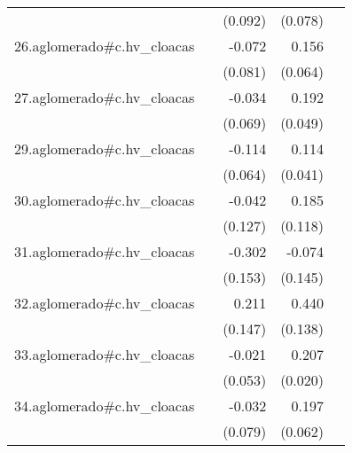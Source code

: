 {\begin{longtable}{l*{4}{D{.}{.}{-1}}}
            &                     &     (0.092)         &     (0.078)         &                     \\
\addlinespace
26.aglomerado#c.hv\_cloacas&                     &      -0.072         &       0.156\sym{*}  &                     \\
            &                     &     (0.081)         &     (0.064)         &                     \\
\addlinespace
27.aglomerado#c.hv\_cloacas&                     &      -0.034         &       0.192\sym{***}&                     \\
            &                     &     (0.069)         &     (0.049)         &                     \\
\addlinespace
29.aglomerado#c.hv\_cloacas&                     &      -0.114         &       0.114\sym{**} &                     \\
            &                     &     (0.064)         &     (0.041)         &                     \\
\addlinespace
30.aglomerado#c.hv\_cloacas&                     &      -0.042         &       0.185         &                     \\
            &                     &     (0.127)         &     (0.118)         &                     \\
\addlinespace
31.aglomerado#c.hv\_cloacas&                     &      -0.302\sym{*}  &      -0.074         &                     \\
            &                     &     (0.153)         &     (0.145)         &                     \\
\addlinespace
32.aglomerado#c.hv\_cloacas&                     &       0.211         &       0.440\sym{**} &                     \\
            &                     &     (0.147)         &     (0.138)         &                     \\
\addlinespace
33.aglomerado#c.hv\_cloacas&                     &      -0.021         &       0.207\sym{***}&                     \\
            &                     &     (0.053)         &     (0.020)         &                     \\
\addlinespace
34.aglomerado#c.hv\_cloacas&                     &      -0.032         &       0.197\sym{**} &                     \\
            &                     &     (0.079)         &     (0.062)         &                     \\

\end{longtable}}
